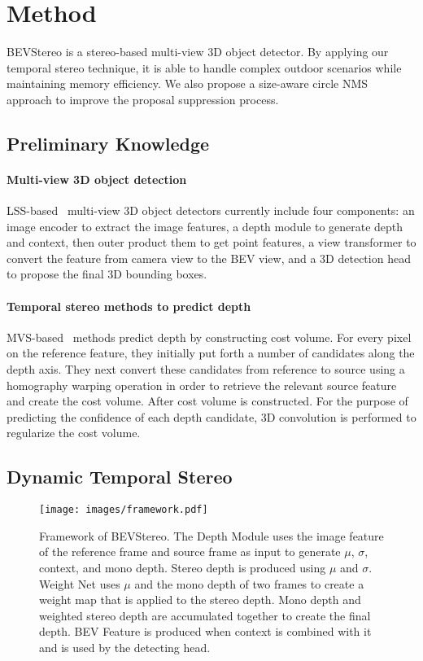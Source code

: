 \documentclass[letterpaper]{article} \usepackage[]{aaai23}  \usepackage{times}  \usepackage{helvet}  \usepackage{courier}  \usepackage[hyphens]{url}  \usepackage{graphicx} \urlstyle{rm} \def\UrlFont{\rm}  \usepackage{natbib}  \usepackage{caption} \frenchspacing  \setlength{\pdfpagewidth}{8.5in} \setlength{\pdfpageheight}{11in} \usepackage{algorithm}
\begin{document}
\section{Method}
BEVStereo is a stereo-based multi-view 3D object detector.
By applying our temporal stereo technique, it is able to handle complex outdoor scenarios while maintaining memory efficiency. We also propose a size-aware circle NMS approach to improve the proposal suppression process.

\subsection{Preliminary Knowledge}
\paragraph{Multi-view 3D object detection}
LSS-based~\cite{philion2020lift} multi-view 3D object detectors currently include four components: an image encoder to extract the image features, a depth module to generate depth and context, then outer product them to get point features, a view transformer to convert the feature from camera view to the BEV view, and a 3D detection head to propose the final 3D bounding boxes.
\paragraph{Temporal stereo methods to predict depth}
MVS-based~\cite{yao2018mvsnet} methods predict depth by constructing cost volume. For every pixel on the reference feature, they initially put forth a number of candidates along the depth axis. They next convert these candidates from reference to source using a homography warping operation in order to retrieve the relevant source feature and create the cost volume. After cost volume is constructed. For the purpose of predicting the confidence of each depth candidate, 3D convolution is performed to regularize the cost volume.

\subsection{Dynamic Temporal Stereo}
\begin{figure*}[t]
\texttt{[image: images/framework.pdf]}
\centering
\caption{Framework of BEVStereo. The Depth Module uses the image feature of the reference frame and source frame as input to generate $\mu$, $\sigma$, context, and mono depth. Stereo depth is produced using $\mu$ and $\sigma$. Weight Net uses $\mu$ and the mono depth of two frames to create a weight map that is applied to the stereo depth. Mono depth and weighted stereo depth are accumulated together to create the final depth. BEV Feature is produced when context is combined with it and is used by the detecting head.}
\label{fig:bevdepth}
\end{figure*}
\end{document}
